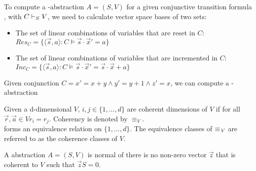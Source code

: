 To compute a \qvasr-abstraction $A = (S, V)$ for a given conjunctive transition formula \conjunctTF, with $C \vdash_{S} V$, we need to calculate vector space bases of two sets:
\begin{itemize}
 \item The set of linear combinations of variables that are reset in $C$: $Res_C = \{ \langle \vec{s}, a \rangle : C \models \vec{s} \cdot \vec{x}' = a \}$
 \item The set of linear combinations of variables that are incremented in $C$: $Inc_C = \{ \langle \vec{s}, a \rangle : C \models \vec{s} \cdot \vec{x}' = \vec{s} \cdot \vec{x} + a \}$
\end{itemize}
\begin{example}
Given conjunction $C = x' = x+ y \land y' = y+ 1 \land z' = x$, we can compute a \qvasr-abstraction
\end{example}

\begin{mydef}
Given a d-dimensional \qvasr $\mathit{V}$,  $i, j \in \{1 ,\ldots, d\}$ are coherent dimensions of $\mathit{V}$ if for all $\vec{r}, \vec{a} \in \mathit{V} r_i = r_j$. Coherency is denoted by $\equiv_{\mathit{V}}$. \\
\coherent forms an equivalence relation on $\{1, \ldots, d\}$. The equivalence classes of $\equiv_{\mathit{V}}$ are referred to as the coherence classes of $\mathit{V}$.
\end{mydef}

\begin{mydef}
A \qvasr abstraction $\mathit{A = (S, V)}$ is normal of there is no non-zero vector $\vec{z}$ that is coherent to $\mathit{V}$ such that $\vec{z}S = 0$.
\end{mydef}

